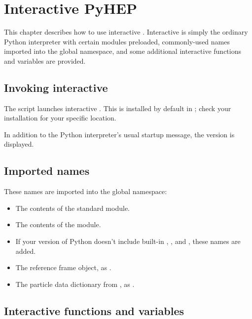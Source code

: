\chapter{Interactive PyHEP}


This chapter describes how to use interactive \pyhep.  Interactive
\pyhep is simply the ordinary Python interpreter with certain \pyhep
modules preloaded, commonly-used names imported into the global
namespace, and some additional interactive functions and variables are
provided.


\section{Invoking interactive \pyhep}

The  script launches interactive \pyhep.  This is installed
by default in ; check your installation for your specific
location.  

In addition to the Python interpreter's usual startup message, the
\pyhep version is displayed.

\section{Imported names}

These names are imported into the global namespace:
\begin{itemize}

 \item The contents of the standard  module.

 \item The contents of the  module.

 \item If your version of Python doesn't include built-in ,
 , and , these names are added.

 \item The  reference frame object, as .

 \item The  particle data dictionary from
 , as .

\end{itemize}


\section{Interactive functions and variables}

